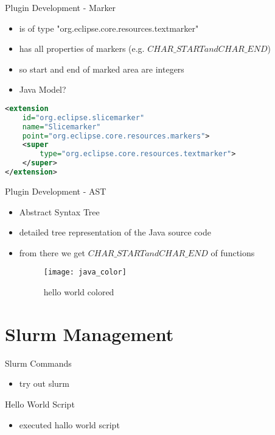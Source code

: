 \documentclass[11pt,aspectratio=169]{beamer}
\begin{document}
\begin{frame}[fragile]{Plugin Development - Marker}
  \begin{itemize}
    \item is of type "org.eclipse.core.resources.textmarker"
    \item has all properties of markers (e.g. $CHAR\_START and CHAR\_END$)
    \item so start and end of marked area are integers
    \item Java Model?
  \end{itemize}
  \begin{lstlisting}[language=XML]
<extension
    id="org.eclipse.slicemarker"
    name="Slicemarker"
    point="org.eclipse.core.resources.markers">
    <super
        type="org.eclipse.core.resources.textmarker">
    </super>
</extension>
  \end{lstlisting}
\end{frame}

\begin{frame}{Plugin Development - AST}
  \begin{itemize}
    \item Abstract Syntax Tree
    \item detailed tree representation of the Java source code
    \item from there we get $CHAR\_START and CHAR\_END$ of functions
    \begin{figure}[ht]
      \texttt{[image: java\_color]}
      \caption{hello world colored}
      \label{fig3}
    \end{figure}
  \end{itemize}
\end{frame}


\section{Slurm Management}

\begin{frame}{Slurm Commands}
  \begin{itemize}
    \item try out slurm
  \end{itemize}
  
\end{frame}

\begin{frame}{Hello World Script}
  \begin{itemize}
    \item executed hallo world script
  \end{itemize}
  
\end{frame}
\end{document}
